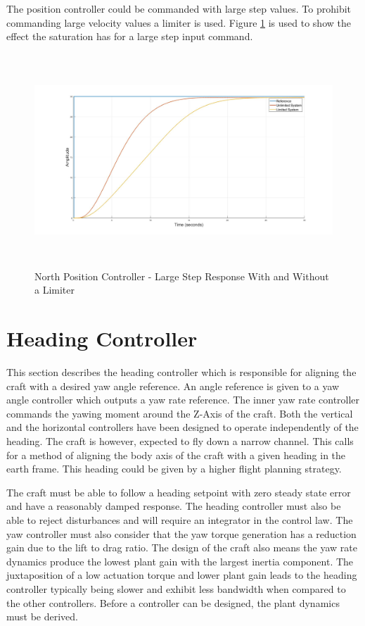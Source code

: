 		The position controller could be commanded with large step values. To prohibit commanding large velocity values a limiter is used. Figure \ref{IM_NorthPosControlLargeStep} is used to show the effect the saturation has for a large step input command. 
			
		\begin{figure}[H]
			\centering
			\includegraphics[height = 8cm]{../Design/Matlab/Controllers/north_pos_limit_step.jpg}
			\caption{North Position Controller -  Large Step Response With and Without a Limiter}
			\label{IM_NorthPosControlLargeStep}
		\end{figure}
				
\section{Heading Controller}
This section describes the heading controller which is responsible for aligning the craft with a desired yaw angle reference. An angle reference is given to a yaw angle controller which outputs a yaw rate reference. The inner yaw rate controller commands the yawing moment around the Z-Axis of the craft. Both the vertical and the horizontal controllers have been designed to operate independently of the heading. The craft is however, expected to fly down a narrow channel. This calls for a method of aligning the body axis of the craft with a given heading in the earth frame. This heading could be given by a higher flight planning strategy.

The craft must be able to follow a heading setpoint with zero steady state error and have a reasonably damped response. The heading controller must also be able to reject disturbances and will require an integrator in the control law. The yaw controller must also consider that the yaw torque generation has a reduction gain due to the lift to drag ratio. The design of the craft also means the yaw rate dynamics produce the lowest plant gain with the largest inertia component. The juxtaposition of a low actuation torque and lower plant gain leads to the heading controller typically being slower and exhibit less bandwidth when compared to the other controllers. Before a controller can be designed, the plant dynamics must be derived.
	
